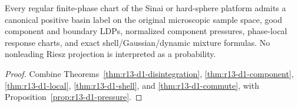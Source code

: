 \begin{theorem}
\label{thm:r13-d1-main}
Every regular finite-phase chart of the Sinai or hard-sphere platform admits a
canonical positive basin label on the original microscopic sample space, good
component and boundary LDPs, normalized component pressures, phase-local
response charts, and exact shell/Gaussian/dynamic mixture formulas.  No
nonleading Riesz projection is interpreted as a probability.
\end{theorem}

\begin{proof}
Combine Theorems~\ref{thm:r13-d1-disintegration},
\ref{thm:r13-d1-component}, \ref{thm:r13-d1-local},
\ref{thm:r13-d1-shell}, and \ref{thm:r13-d1-commute}, with
Proposition~\ref{prop:r13-d1-pressure}.
\end{proof}

